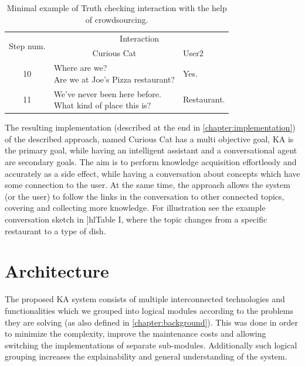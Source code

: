 \begin{table}[h!]
\centering
\caption{Minimal example of Truth checking interaction with the help of 
	crowdsourcing.}
\label{tab:conversation2}
\begin{tabular}{|c|l|l|}
	\hline
	\multirow{2}{2em}{Step num.} & \multicolumn{2}{c|}{Interaction}\\\cline{2-3}
	& \multicolumn{1}{c|}{Curious Cat} & User2 \\
	\hline
	10 & \makecell[l]{Where are we? \\Are we at Joe's Pizza restaurant?} & Yes.\\
    \hline
	11 & \makecell[l]{We've never been here before.\\ What kind of place this is?} & Restaurant.\\
    \hline
\end{tabular}
\end{table}

The resulting implementation (described at the end in 
\autoref{chapter:implementation}) of the described approach, named Curious Cat 
has a multi objective goal, KA is the primary goal, while having an intelligent 
assistant and a conversational agent are secondary goals. The aim is to perform
knowledge acquisition effortlessly and accurately as a side effect, while having
a conversation about concepts which have some connection to the user.
At the same time, the approach allows the system (or the user) to follow the 
links in the conversation to other connected topics, covering and collecting
more knowledge. For illustration see the example conversation sketch in 
]hl{Table I}, where the topic changes from a specific restaurant to a type of 
dish.

\section{Architecture}
\label{section:Architecture}
The proposed KA system consists of multiple interconnected technologies and 
functionalities which we grouped into logical modules according to
the problems they are solving (as also defined in \autoref{chapter:background}). 
This was done in order to minimize the complexity, improve the maintenance 
costs and allowing switching the implementations of separate sub-modules. 
Additionally such logical grouping increases the explainability and general
understanding of the system.

